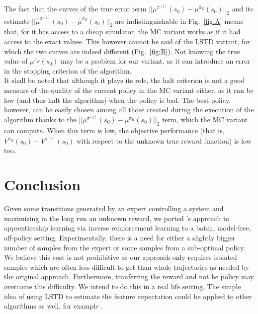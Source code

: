 \documentclass{jfpda2011}
\begin{document}
The fact that  the curves of the true error term $||\mu^{\pi^{(j)}}(s_0) - \mu^{\pi_E}(s_0)||_2$ and  its estimate $||\hat\mu^{\pi^{(j)}}(s_0) - \hat\mu^{\pi_E}(s_0)||_2$ are indistinguishable in Fig.~\ref{fig:A} means that, for it has access to a cheap simulator, the MC variant works as if it had access to the exact values. This however cannot be said of the LSTD variant, for which the two curves are indeed different (Fig.~\ref{fig:B}). Not knowing the true value of $\mu^{\pi_E}(s_0)$ may be a problem for our variant, as it can introduce an error in the stopping criterion of the algorithm.\\

It shall be noted that although it plays its role, the halt criterion is not a good measure of the quality of the current policy in the MC variant either, as it can be low (and thus halt the algorithm) when the policy is bad. The best policy, however, can be easily chosen among all those created during the execution of the algorithm thanks to the $||\mu^{\pi^{(j)}}(s_0) - \mu^{\pi_E}(s_0)||_2$ term, which the MC variant can compute. When this term is low, the objective performance (that is, $V^{\pi_E}(s_0)-V^{\pi^{(j)}}(s_0)$ with respect to the unknown true reward function) is low too. 
\section{Conclusion}
\label{sec:conclusion}
Given some transitions generated by an expert controlling a system and maximizing in the long run an unknown reward, we ported \citet{abbeel2004apprenticeship}'s approach to apprenticeship learning via inverse reinforcement learning to a batch, model-free, off-policy setting. Experimentally, there is a need for either a slightly bigger number of samples from the expert or some samples from a sub-optimal policy. We believe this cost is not prohibitive as our approach only requires isolated samples which are often less difficult to get than whole trajectories as needed by the original approach. Furthermore, tranferring the reward and not he policy may overcome this difficulty. We intend to do this in a real life setting.
The simple idea of using LSTD to estimate the feature expectation could be applied to other algorithms as well, for example \citep{abbeel2004apprenticeship,syed2008apprenticeship,syed2008game,ziebart2008maximum}.\\


%

\end{document}
